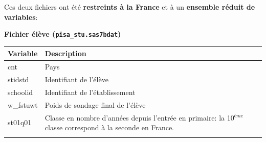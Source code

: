 \documentclass[12pt,twosided, notitlepage]{book}
\begin{document}
Ces deux fichiers ont été \textbf{restreints à la France} et à un
\textbf{ensemble réduit de variables}:

\textbf{Fichier élève (\texttt{pisa\_stu.sas7bdat})}

\begin{longtable}[]{@{}ll@{}}
\toprule
\begin{minipage}[b]{0.38\columnwidth}\raggedright
\textbf{Variable}\strut
\end{minipage} & \begin{minipage}[b]{0.56\columnwidth}\raggedright
\textbf{Description}\strut
\end{minipage}\tabularnewline
\midrule
\endhead
\begin{minipage}[t]{0.38\columnwidth}\raggedright
cnt\strut
\end{minipage} & \begin{minipage}[t]{0.56\columnwidth}\raggedright
Pays\strut
\end{minipage}\tabularnewline
\begin{minipage}[t]{0.38\columnwidth}\raggedright
stidstd\strut
\end{minipage} & \begin{minipage}[t]{0.56\columnwidth}\raggedright
Identifiant de l'élève\strut
\end{minipage}\tabularnewline
\begin{minipage}[t]{0.38\columnwidth}\raggedright
schoolid\strut
\end{minipage} & \begin{minipage}[t]{0.56\columnwidth}\raggedright
Identifiant de l'établissement\strut
\end{minipage}\tabularnewline
\begin{minipage}[t]{0.38\columnwidth}\raggedright
w\_fstuwt\strut
\end{minipage} & \begin{minipage}[t]{0.56\columnwidth}\raggedright
Poids de sondage final de l'élève\strut
\end{minipage}\tabularnewline
\begin{minipage}[t]{0.38\columnwidth}\raggedright
st01q01\strut
\end{minipage} & \begin{minipage}[t]{0.56\columnwidth}\raggedright
Classe en nombre d'années depuis l'entrée en primaire: la 10\(^{ème}\)
classe correspond à la seconde en France.\strut
\end{minipage}\tabularnewline
\begin{minipage}[t]{0.38\columnwidth}\raggedright

\end{minipage}
\end{longtable}
\end{document}
